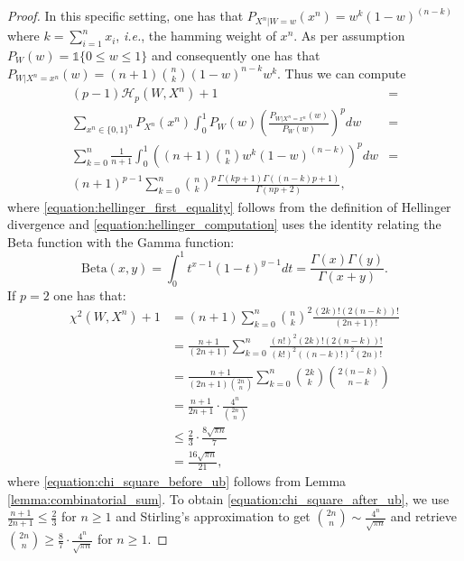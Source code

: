 \documentclass[conference]{IEEEtran}
\theoremstyle{plain}
\theoremstyle{definition}
\theoremstyle{remark}
\begin{document}
\begin{proof}
In this specific setting, one has that $P_{X^n|W=w}(x^n) = w^k(1-w)^{(n-k)}$ where $k=\sum_{i=1}^n x_i$, \textit{i.e.}, the hamming weight of $x^n$. As per assumption $P_W(w)=\mathds{1}\{0\leq w\leq 1\}$ and consequently one has that $P_{W|X^n=x^n}(w)= (n+1)\binom{n}{k}(1-w)^{n-k}w^k$. Thus we can compute
\begin{align}
    (p-1)\mathcal{H}_p(W,X^n)+1 &= \\ \sum_{x^n \in \{0, 1\}^n} P_{X^n}(x^n)\int_0^1 P_W(w)\left(\frac{P_{W|X^n=x^n}(w)}{P_W(w)}\right)^pdw &= \label{equation:hellinger_first_equality}\\ \sum_{k=0}^n \frac{1}{n+1}\int_0^1 \left((n+1)\binom{n}{k}w^k(1-w)^{(n-k)}\right)^p dw &= \\ (n+1)^{p-1}\sum_{k=0}^n \binom{n}{k}^p\frac{\Gamma(kp+1)\Gamma((n-k)p+1)}{\Gamma(np+2)},\label{equation:hellinger_computation}
\end{align}
where \eqref{equation:hellinger_first_equality} follows from the definition of Hellinger divergence and \eqref{equation:hellinger_computation} uses the identity relating the Beta function with the Gamma function:
\begin{equation}
    \mathrm{Beta}(x, y) = \int_0^1 t^{x-1}(1-t)^{y-1}dt = \frac{\Gamma(x)\Gamma(y)}{\Gamma(x+y)}.
\end{equation}
If $p=2$ one has that:
\begin{align}
    \chi^2(W,X^n)+1 &= (n+1)\sum_{k=0}^n \binom{n}{k}^2\frac{(2k)!(2(n-k))!}{(2n+1)!}\\&=\frac{n+1}{(2n+1)} \sum_{k=0}^n \frac{(n!)^2(2k)!(2(n-k))!}{(k!)^2((n-k)!)^2(2n)!}\\&= \frac{n+1}{(2n+1)\binom{2n}{n}} \sum_{k=0}^n \binom{2k}{k}\binom{2(n-k)}{n-k} \\&= \frac{n+1}{2n+1}\cdot \frac{4^n}{\binom{2n}{n}}\label{equation:chi_square_before_ub}\\&\leq \frac{2}{3}\cdot \frac{8\sqrt{\pi n}}{7}\label{equation:chi_square_after_ub}\\&= \frac{16\sqrt{\pi n}}{21},\label{equation:bernoulli_chi_square}
\end{align}
where \eqref{equation:chi_square_before_ub} follows from Lemma \ref{lemma:combinatorial_sum}. To obtain \eqref{equation:chi_square_after_ub}, we use $\frac{n+1}{2n+1} \leq \frac{2}{3}$ for $n\geq1$ and Stirling's approximation to get $\binom{2n}{n} \sim \frac{4^n}{\sqrt{\pi n}}$ and retrieve $\binom{2n}{n} \geq \frac{8}{7} \cdot \frac{4^n}{\sqrt{\pi n}}$ for $n\geq 1$.
\end{proof}
\end{document}
